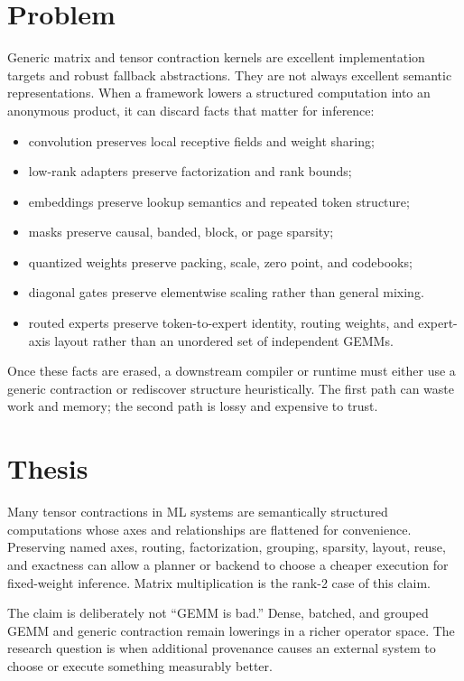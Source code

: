 \documentclass[11pt]{article}
\begin{document}
\section{Problem}

Generic matrix and tensor contraction kernels are excellent implementation
targets and robust fallback abstractions. They are not always excellent semantic
representations. When a framework lowers a structured computation into an
anonymous product, it can discard facts that matter for inference:

\begin{itemize}
  \item convolution preserves local receptive fields and weight sharing;
  \item low-rank adapters preserve factorization and rank bounds;
  \item embeddings preserve lookup semantics and repeated token structure;
  \item masks preserve causal, banded, block, or page sparsity;
  \item quantized weights preserve packing, scale, zero point, and codebooks;
  \item diagonal gates preserve elementwise scaling rather than general mixing.
  \item routed experts preserve token-to-expert identity, routing weights, and
  expert-axis layout rather than an unordered set of independent GEMMs.
\end{itemize}

Once these facts are erased, a downstream compiler or runtime must either use a
generic contraction or rediscover structure heuristically. The first path can
waste work and memory; the second path is lossy and expensive to trust.

\section{Thesis}

Many tensor contractions in ML systems are semantically structured computations
whose axes and relationships are flattened for convenience. Preserving named
axes, routing, factorization, grouping, sparsity, layout, reuse, and exactness
can allow a planner or backend to choose a cheaper execution for fixed-weight
inference. Matrix multiplication is the rank-2 case of this claim.

The claim is deliberately not ``GEMM is bad.'' Dense, batched, and grouped GEMM
and generic contraction remain lowerings in a richer operator space. The
research question is when additional provenance causes an external system to
choose or execute something measurably better.
\end{document}
